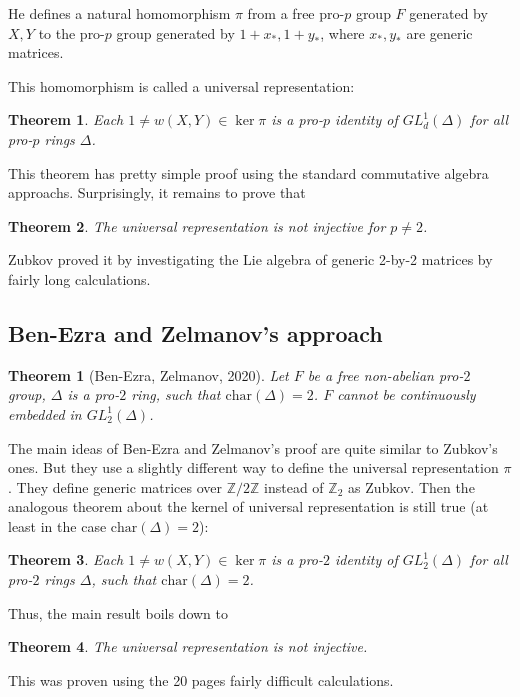 \documentclass[12pt,a4paper]{article}
\newtheorem{theorem}{Theorem}[subsection]
\newtheorem*{theorem*}{Theorem}
\begin{document}
    He defines a natural homomorphism $\pi$ from a free pro-$p$ group $F$ generated by $X, Y$ to the pro-$p$ group generated by
    $1 + x_*, 1 + y_*$, where $x_*, y_*$ are generic matrices.

    This homomorphism is called a universal representation:
    \vskip 0.1in\noindent
    \begin{theorem}
        Each $1\neq w(X, Y) \in \ker \pi$ is a pro-$p$ identity of $GL^1_d(\Delta)$ for all pro-$p$ rings $\Delta$.
    \end{theorem}
    \vskip 0.1in\noindent
    This theorem has pretty simple proof using the standard commutative algebra approachs.
    Surprisingly, it remains to prove that
    \vskip 0.1in\noindent
    \begin{theorem}
        The universal representation is not injective for $p\neq 2$.
    \end{theorem}
    \vskip 0.1in\noindent
    Zubkov proved it by investigating the Lie algebra of generic 2-by-2 matrices by fairly long calculations.

    \subsection{Ben-Ezra and Zelmanov's approach}
    \begin{theorem*}[Ben-Ezra, Zelmanov, 2020]
        Let $F$ be a free non-abelian pro-$2$ group, $\Delta$ is a pro-$2$ ring, such that $\mathrm{char}(\Delta)=2$.
        $F$ cannot be continuously embedded in $GL^1_2(\Delta)$.
    \end{theorem*}
    \vskip 0.1in\noindent

    The main ideas of Ben-Ezra and Zelmanov's proof are quite similar to Zubkov's ones.
    But they use a slightly different way to define the universal representation $\pi$.
    They define generic matrices over $\mathbb{Z}/2\mathbb{Z}$ instead of $\mathbb{Z}_2$ as Zubkov.
    Then the analogous theorem about the kernel of universal representation is still true (at least in the case $\mathrm{char}(\Delta)=2$):
    \vskip 0.1in\noindent
    \begin{theorem}
        Each $1\neq w(X, Y) \in \ker \pi$ is a pro-$2$ identity of $GL^1_2(\Delta)$ for all pro-$2$ rings $\Delta$, such that $\mathrm{char}(\Delta)=2$.
    \end{theorem}
    \vskip 0.1in\noindent

    Thus, the main result boils down to
    \vskip 0.1in\noindent
    \begin{theorem}
        The universal representation is not injective.
    \end{theorem}
    \vskip 0.1in\noindent
    This was proven using the 20 pages fairly difficult calculations.
\end{document}
